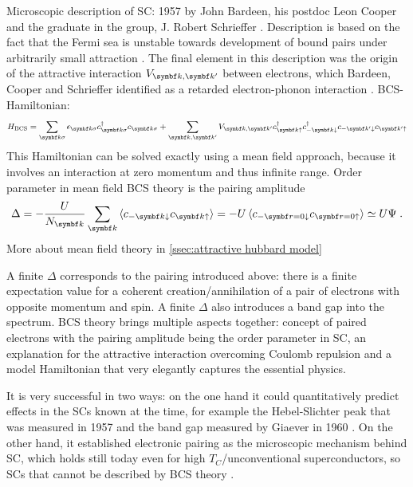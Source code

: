 \documentclass[../notes.tex]{subfiles}
\begin{document}
Microscopic description of SC: 1957 by John Bardeen, his postdoc Leon Cooper and the graduate in the group, J. Robert Schrieffer \cite{bardeenTheorySuperconductivity1957}.
Description is based on the fact that the Fermi sea is unstable towards development of bound pairs under arbitrarily small attraction \cite{cooperBoundElectronPairs1956}.
The final element in this description was the origin of the attractive interaction \(V_{{\vb{k}, \vb{k}^{\prime}}}\) between electrons, which Bardeen, Cooper and Schrieffer identified as a retarded electron-phonon interaction \cite{bardeenTheorySuperconductivity1957}.
BCS-Hamiltonian:
\begin{equation}\label{eq:BCS Hamiltonian}
	H_{\text{BCS}} = \sum_{\vb{k}\sigma} \epsilon_{\vb{k}\sigma} c_{\vb{k}\sigma}^{\dagger} c_{\vb{k}\sigma} + \sum_{\vb{k}, \vb{k}^{\prime}} V_{\vb{k}, \vb{k}^{\prime}} c_{\vb{k}\uparrow}^{\dagger} c_{-\vb{k}\downarrow}^{\dagger} c_{-\vb{k}^{\prime}\downarrow} c_{\vb{k}^{\prime}\uparrow}
\end{equation}
This Hamiltonian can be solved exactly using a mean field approach, because it involves an interaction at zero momentum and thus infinite range.
Order parameter in mean field BCS theory is the pairing amplitude
\begin{equation}
	\Delta = - \frac{U}{N_{\vb{k}}} \sum_{\vb{k}} \braket{c_{-\vb{k} \downarrow} c_{\vb{k} \uparrow}} = - U \braket{c_{-\vb{r}=0 \downarrow} c_{\vb{r=0} \uparrow}} \simeq U \Psi \;.
\end{equation}
More about mean field theory in \cref{ssec:attractive hubbard model}

A finite \(\Delta\) corresponds to the pairing introduced above: there is a finite expectation value for a coherent creation/annihilation of a pair of electrons with opposite momentum and spin.
A finite \(\Delta\) also introduces a band gap into the spectrum.
BCS theory brings multiple aspects together: concept of paired electrons with the pairing amplitude being the order parameter in SC, an explanation for the attractive interaction overcoming Coulomb repulsion and a model Hamiltonian that very elegantly captures the essential physics.

It is very successful in two ways: on the one hand it could quantitatively predict effects in the SCs known at the time, for example the Hebel-Slichter peak that was measured in 1957 \cite{hebelNuclearRelaxationSuperconducting1957, hebelNuclearSpinRelaxation1959} and the band gap measured by Giaever in 1960 \cite{giaeverStudySuperconductorsElectron1961}.  
On the other hand, it established electronic pairing as the microscopic mechanism behind SC, which holds still today even for high \(T_C\)/unconventional superconductors, so SCs that cannot be described by BCS theory \cite{zhouHightemperatureSuperconductivity2021}.
\end{document}
